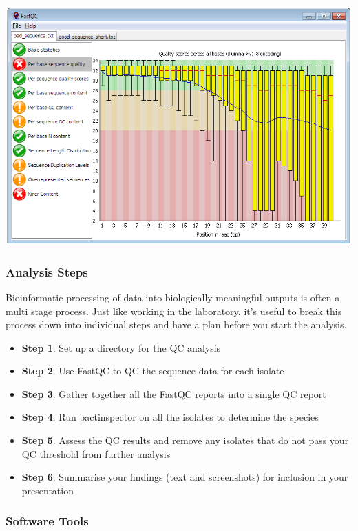 \documentclass[11pt]{article}
\providecommand{\tightlist}{%
      \setlength{\itemsep}{0pt}\setlength{\parskip}{0pt}}
\begin{document}
\begin{center}
\includegraphics[FastQC]{img/fastqc.png}
\end{center}


\hypertarget{analysis-steps}{%
\subsubsection{Analysis Steps}\label{analysis-steps}}

Bioinformatic processing of data into biologically-meaningful outputs is
often a multi stage process. Just like working in the laboratory, it's
useful to break this process down into individual steps and have a plan
before you start the analysis.

\begin{itemize}
\tightlist
\item
  \textbf{Step 1}. Set up a directory for the QC analysis
\item
  \textbf{Step 2}. Use FastQC to QC the sequence data for each isolate
\item
  \textbf{Step 3}. Gather together all the FastQC reports into a single
  QC report
\item
  \textbf{Step 4}. Run bactinspector on all the isolates to determine
  the species
\item
  \textbf{Step 5}. Assess the QC results and remove any isolates that do
  not pass your QC threshold from further analysis
\item
  \textbf{Step 6}. Summarise your findings (text and screenshots) for
  inclusion in your presentation
\end{itemize}

\hypertarget{software-tools}{%
\subsubsection{Software Tools}\label{software-tools}}
\end{document}
